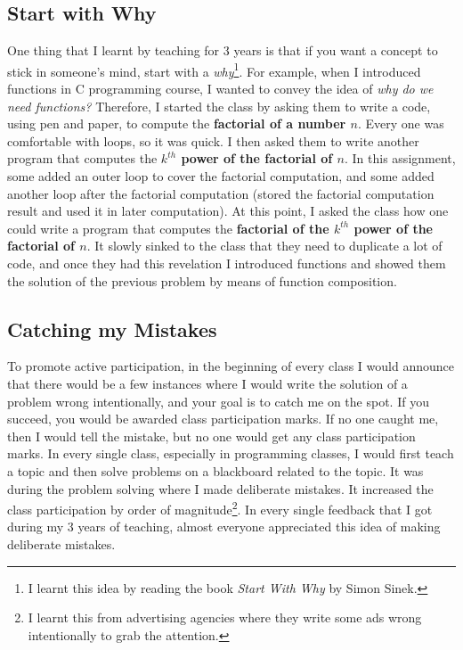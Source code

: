 \documentclass[a4paper]{article}
\begin{document}
\subsection{Start with Why}
One thing that I learnt by teaching for 3 years is that if you want a concept 
to stick in someone's mind, start with a \textit{why}\footnote{I learnt this idea by reading the book 
\textit{Start With Why} by Simon Sinek.}. For example, when I introduced functions 
in C programming course, I wanted to convey the idea of \textit{why do we need functions?} Therefore, I started the class by 
asking them to write a code, using pen and paper, to compute the \textbf{factorial of a number $n$}. 
Every one was comfortable with loops, so it was quick. I then asked them to write 
another program that computes the \textbf{$k^{th}$ power of the factorial of $n$}. 
In this assignment, some added an outer loop to cover the factorial computation, 
and some added another loop after the factorial computation (stored the factorial 
computation result and used it in later computation). 
At this point, I asked the class 
how one could write a program that computes the \textbf{factorial of 
the $k^{th}$ power of the factorial of $n$}. It slowly 
sinked to the class that they need to duplicate a lot of code, and once 
they had this revelation I introduced functions 
and showed them the solution of the previous problem by means of function composition.

\subsection{Catching my Mistakes}
To promote active participation, in the beginning of every class 
I would announce that there would be 
a few instances where I would write the solution of a problem wrong intentionally, 
and your goal is to catch me on the spot. If you succeed, you would be awarded 
class participation marks. If no one caught me, 
then I would tell the mistake, but no one would get any 
class participation marks. In every single class, especially in programming classes, 
I would first teach a topic and then solve problems on 
a blackboard related to the topic. 
It was during the problem solving where I made deliberate mistakes.
It increased the class participation by order of 
magnitude\footnote{I learnt this 
from advertising agencies where they write some ads wrong 
intentionally to grab the attention.}. In every single 
feedback that I got during my 3 years of teaching, 
almost everyone appreciated this idea of making deliberate mistakes. 
\end{document}
